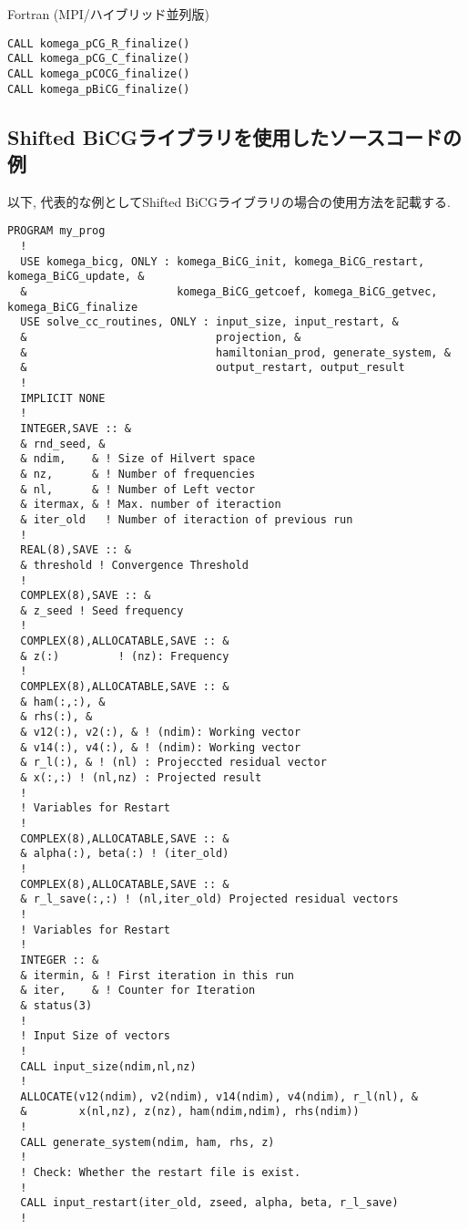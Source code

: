 \documentclass[12pt,titlepage]{jarticle}
\begin{document}
\noindent Fortran (MPI/ハイブリッド並列版)
\begin{verbatim}
CALL komega_pCG_R_finalize()
CALL komega_pCG_C_finalize()
CALL komega_pCOCG_finalize()
CALL komega_pBiCG_finalize()
\end{verbatim}

\subsection{Shifted BiCGライブラリを使用したソースコードの例}

以下, 代表的な例としてShifted BiCGライブラリの場合の使用方法を記載する. 

\begin{lstlisting}
PROGRAM my_prog
  !
  USE komega_bicg, ONLY : komega_BiCG_init, komega_BiCG_restart, komega_BiCG_update, &
  &                       komega_BiCG_getcoef, komega_BiCG_getvec, komega_BiCG_finalize
  USE solve_cc_routines, ONLY : input_size, input_restart, &
  &                             projection, &
  &                             hamiltonian_prod, generate_system, &
  &                             output_restart, output_result
  !
  IMPLICIT NONE
  !
  INTEGER,SAVE :: &
  & rnd_seed, &
  & ndim,    & ! Size of Hilvert space
  & nz,      & ! Number of frequencies
  & nl,      & ! Number of Left vector
  & itermax, & ! Max. number of iteraction
  & iter_old   ! Number of iteraction of previous run
  !
  REAL(8),SAVE :: &
  & threshold ! Convergence Threshold
  !
  COMPLEX(8),SAVE :: &
  & z_seed ! Seed frequency
  !
  COMPLEX(8),ALLOCATABLE,SAVE :: &
  & z(:)         ! (nz): Frequency
  !
  COMPLEX(8),ALLOCATABLE,SAVE :: &
  & ham(:,:), &
  & rhs(:), &
  & v12(:), v2(:), & ! (ndim): Working vector
  & v14(:), v4(:), & ! (ndim): Working vector
  & r_l(:), & ! (nl) : Projeccted residual vector 
  & x(:,:) ! (nl,nz) : Projected result 
  !
  ! Variables for Restart
  !
  COMPLEX(8),ALLOCATABLE,SAVE :: &
  & alpha(:), beta(:) ! (iter_old) 
  !
  COMPLEX(8),ALLOCATABLE,SAVE :: &
  & r_l_save(:,:) ! (nl,iter_old) Projected residual vectors
  !
  ! Variables for Restart
  !
  INTEGER :: &
  & itermin, & ! First iteration in this run
  & iter,    & ! Counter for Iteration
  & status(3)
  !
  ! Input Size of vectors
  !
  CALL input_size(ndim,nl,nz)
  !
  ALLOCATE(v12(ndim), v2(ndim), v14(ndim), v4(ndim), r_l(nl), &
  &        x(nl,nz), z(nz), ham(ndim,ndim), rhs(ndim))
  !
  CALL generate_system(ndim, ham, rhs, z)
  !
  ! Check: Whether the restart file is exist.
  !
  CALL input_restart(iter_old, zseed, alpha, beta, r_l_save)
  !

\end{lstlisting}
\end{document}
